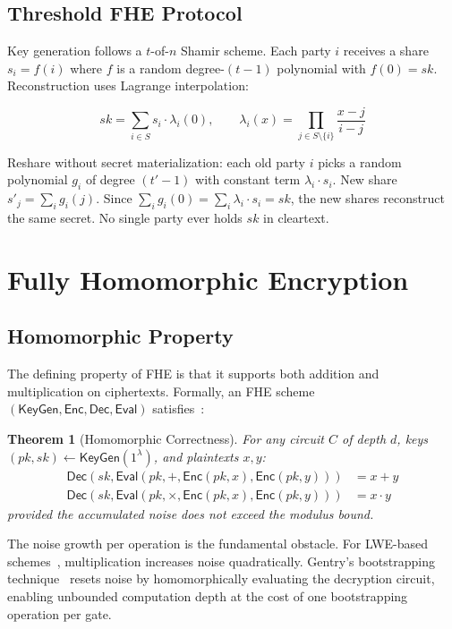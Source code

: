 \documentclass[11pt,a4paper]{article}
\newtheorem{theorem}{Theorem}[section]
\begin{document}
\subsection{Threshold FHE Protocol}

Key generation follows a $t$-of-$n$ Shamir scheme. Each party $i$
receives a share $s_i = f(i)$ where $f$ is a random degree-$(t{-}1)$
polynomial with $f(0) = \mathit{sk}$. Reconstruction uses Lagrange
interpolation:

\[
\mathit{sk} = \sum_{i \in S} s_i \cdot \lambda_i(0),
\qquad
\lambda_i(x) = \prod_{j \in S \setminus \{i\}} \frac{x - j}{i - j}
\]

Reshare without secret materialization: each old party $i$ picks a
random polynomial $g_i$ of degree $(t'{-}1)$ with constant term
$\lambda_i \cdot s_i$. New share $s'_j = \sum_i g_i(j)$. Since
$\sum_i g_i(0) = \sum_i \lambda_i \cdot s_i = \mathit{sk}$, the new
shares reconstruct the same secret. No single party ever holds
$\mathit{sk}$ in cleartext.

\section{Fully Homomorphic Encryption}

\subsection{Homomorphic Property}

The defining property of FHE is that it supports both addition and
multiplication on ciphertexts. Formally, an FHE scheme
$(\mathsf{KeyGen}, \mathsf{Enc}, \mathsf{Dec}, \mathsf{Eval})$
satisfies~\cite{gentry2009}:

\begin{theorem}[Homomorphic Correctness]
For any circuit $C$ of depth $d$, keys $(pk, sk) \leftarrow
\mathsf{KeyGen}(1^\lambda)$, and plaintexts $x, y$:
\begin{align}
\mathsf{Dec}(sk, \mathsf{Eval}(pk, +, \mathsf{Enc}(pk,x),
  \mathsf{Enc}(pk,y))) &= x + y \\
\mathsf{Dec}(sk, \mathsf{Eval}(pk, \times, \mathsf{Enc}(pk,x),
  \mathsf{Enc}(pk,y))) &= x \cdot y
\end{align}
provided the accumulated noise does not exceed the modulus bound.
\end{theorem}

The noise growth per operation is the fundamental obstacle. For
LWE-based schemes~\cite{gsw2013}, multiplication increases noise
quadratically. Gentry's bootstrapping technique~\cite{gentry2009}
resets noise by homomorphically evaluating the decryption circuit,
enabling unbounded computation depth at the cost of one bootstrapping
operation per gate.
\end{document}
